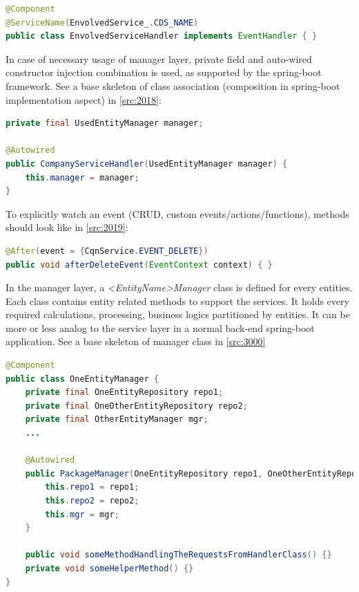 \begin{lstlisting}[language={java}]
@Component
@ServiceName(EnvolvedService_.CDS_NAME)
public class EnvolvedServiceHandler implements EventHandler { }
\end{lstlisting}

In case of necessary usage of manager layer, private field and auto-wired constructor injection combination is used, as supported by the spring-boot framework. See a base skeleton of class association (composition in spring-boot implementation aspect) in \autoref{src:2018}:

\begin{lstlisting}[language={java}]
private final UsedEntityManager manager;

@Autowired
public CompanyServiceHandler(UsedEntityManager manager) {
    this.manager = manager;
}
\end{lstlisting}

To explicitly watch an event (CRUD, custom events/actions/functions), methods should look like in \autoref{src:2019}:
\begin{lstlisting}[language={java}]
@After(event = {CqnService.EVENT_DELETE})
public void afterDeleteEvent(EventContext context) { }
\end{lstlisting}

\bigskip
In the manager layer, a \textit{<EntityName>Manager} class is defined for every entities. Each class contains entity related methods to support the services. It holds every required calculations, processing, business logics partitioned by entities. It can be more or less analog to the service layer in a normal back-end spring-boot application.
See a base skeleton of manager class in \autoref{src:3000}

\begin{lstlisting}[language={java}]
@Component
public class OneEntityManager {
    private final OneEntityRepository repo1;
    private final OneOtherEntityRepository repo2;
    private final OtherEntityManager mgr;
    ...

    @Autowired
    public PackageManager(OneEntityRepository repo1, OneOtherEntityRepository repo2, OtherEntityManager mgr) {
        this.repo1 = repo1;
        this.repo2 = repo2;
        this.mgr = mgr;
    }

    public void someMethodHandlingTheRequestsFromHandlerClass() {}
    private void someHelperMethod() {}
}
\end{lstlisting}


